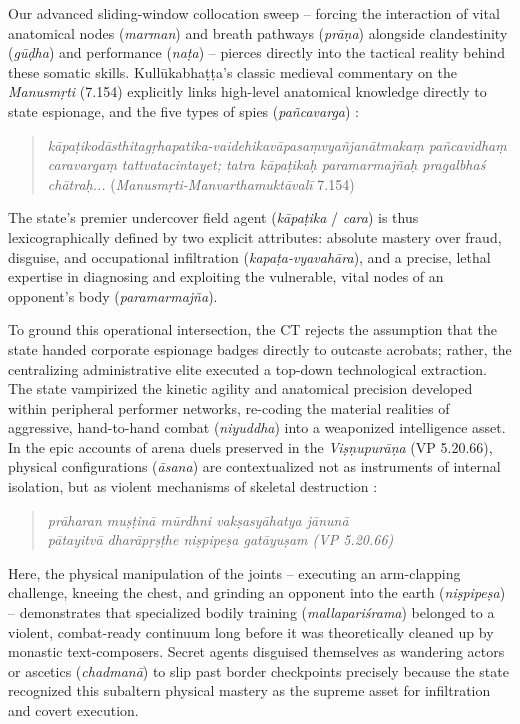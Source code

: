 \documentclass[11pt,twoside,letterpaper]{article}
\begin{document}
Our advanced sliding-window collocation sweep – forcing the interaction of vital anatomical nodes (\textit{marman}) and breath pathways (\textit{prāṇa}) alongside clandestinity (\textit{gūḍha}) and performance (\textit{naṭa}) – pierces directly into the tactical reality behind these somatic skills. Kullūkabhaṭṭa’s classic medieval commentary on the \textit{Manusmṛti} (7.154) explicitly links high-level anatomical knowledge directly to state espionage, and the five types of spies (\textit{pañcavarga}) \citep{GRETIL_vcp}:

\begin{quote}
\textit{kāpaṭikodāsthitagṛhapatika-vaidehikavāpasaṃvyañjanātmakaṃ pañcavidhaṃ caravargaṃ tattvatacintayet; tatra kāpaṭikaḥ paramarmajñaḥ pragalbhaś chātraḥ...} (\textit{Manusmṛti-Manvarthamuktāvalī} 7.154)
\end{quote}

The state’s premier undercover field agent (\textit{kāpaṭika} / \textit{cara}) is thus lexicographically defined by two explicit attributes: absolute mastery over fraud, disguise, and occupational infiltration (\textit{kapaṭa-vyavahāra}), and a precise, lethal expertise in diagnosing and exploiting the vulnerable, vital nodes of an opponent’s body (\textit{paramarmajña}).

To ground this operational intersection, the CT rejects the assumption that the state handed corporate espionage badges directly to outcaste acrobats; rather, the centralizing administrative elite executed a top-down technological extraction. The state vampirized the kinetic agility and anatomical precision developed within peripheral performer networks, re-coding the material realities of aggressive, hand-to-hand combat (\textit{niyuddha}) into a weaponized intelligence asset. In the epic accounts of arena duels preserved in the \textit{Viṣṇupurāṇa} (VP 5.20.66), physical configurations (\textit{āsana}) are contextualized not as instruments of internal isolation, but as violent mechanisms of skeletal destruction \citep{ViP_5}:

\begin{quote}
\noindent\textit{prāharan muṣṭinā mūrdhni vakṣasyāhatya jānunā \\}
\noindent\textit{pātayitvā dharāpṛṣṭhe niṣpipeṣa gatāyuṣam (VP 5.20.66)}
\end{quote}

Here, the physical manipulation of the joints – executing an arm-clapping challenge, kneeing the chest, and grinding an opponent into the earth (\textit{niṣpipeṣa}) – demonstrates that specialized bodily training (\textit{mallapariśrama}) belonged to a violent, combat-ready continuum long before it was theoretically cleaned up by monastic text-composers. Secret agents disguised themselves as wandering actors or ascetics (\textit{chadmanā}) to slip past border checkpoints precisely because the state recognized this subaltern physical mastery as the supreme asset for infiltration and covert execution.
\end{document}
